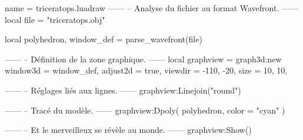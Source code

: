 \documentclass{standalone}
\begin{document}
\begin{luadraw}{name = triceratops.luadraw}
------
-- Analyse du fichier au format Wavefront.
------
local file = "triceratops.obj"

local polyhedron, window_def = parse_wavefront(file)





------
-- Définition de la zone graphique.
------
local graphview = graph3d:new{
  window3d = window_def,
  adjust2d = true,
  viewdir  = {-110, -20},
  size     = {10, 10},
}

------
-- Réglages liés aux lignes.
------
graphview:Linejoin("round")

------
-- Tracé du modèle.
------
graphview:Dpoly(
  polyhedron,
  {
    color = "cyan"
  })

------
-- Et le merveilleux se révèle au monde.
------
graphview:Show()
\end{luadraw}
\end{document}
